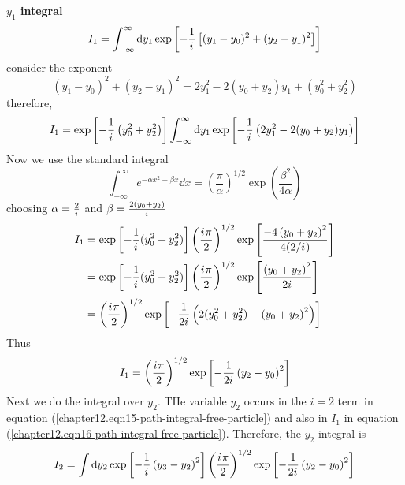 \begin{enumerate}
	\textbf{$y_1$ integral}\\
	\begin{equation}
		I_1 = \int_{-\infty}^{\infty} \dd{y_1} \exp\left[-\frac{1}{{i\mkern1mu}} \left[(y_1 - y_0)^2 + (y_2 - y_1)^2\right]\right]
	\end{equation}
	consider the exponent
	\begin{equation}
		(y_1 - y_0)^2 + (y_2 - y_1)^2 = 2 y_1^2 - 2 (y_0 + y_2) y_1 + (y_0^2+y_2^2)
	\end{equation}
	therefore,
	\begin{equation}
		I_1 = \exp \left[-\frac{1}{{i\mkern1mu}} \left(y_0^2+ y_2^2\right)\right] \int_{-\infty}^{\infty} \dd{y_1} \exp\left[-\frac{1}{{i\mkern1mu}} \left(2y_1^2 - 2(y_0 + y_2) y_1\right)
		\right]
	\end{equation}
	Now we use the standard integral
	\begin{equation}
		\int_{-\infty}^{\infty} e^{-\alpha x^2 + \beta x} \dd{x} = \left(\frac{\pi}{\alpha}\right)^{1/2} \exp \left(\frac{\beta^2}{4\alpha}\right)
	\end{equation}
	choosing $\alpha = \frac{2}{{i\mkern1mu}}$ and $\beta = \frac{2(y_0 + y_2)}{{i\mkern1mu}}$
	\begin{align*}
		I_1 
		&= \exp \left[-\frac{1}{{i\mkern1mu}} (y_0^2 + y_2^2)\right] \left(\frac{{i\mkern1mu} \pi}{2}\right)^{1/2} \exp\left[\frac{-4 \left(y_0 +y_2\right)^2}{4 (2/{i\mkern1mu})}\right]\\
		&= \exp \left[-\frac{1}{{i\mkern1mu}} (y_0^2 + y_2^2)\right] \left(\frac{{i\mkern1mu} \pi}{2}\right)^{1/2} \exp\left[\frac{\left(y_0 +y_2\right)^2}{2{i\mkern1mu}}\right] \\
		&= \left(\frac{{i\mkern1mu} \pi}{2}\right)^{1/2} \exp \left[-\frac{1}{2{i\mkern1mu}} \left( 2(y_0^2 + y_2^2) - \left(y_0 +y_2\right)^2 \right)\right]
	\end{align*}
	Thus
	\begin{equation}
		I_1 = \left(\frac{{i\mkern1mu} \pi}{2}\right)^{1/2} \exp \left[-\frac{1}{2{i\mkern1mu}} \left(y_2 - y_0\right)^2\right]
		\label{chapter12.eqn16-path-integral-free-particle}
	\end{equation}
	Next we do the integral over $y_2$. THe variable $y_2$ occurs in the $i=2$ term in equation (\ref{chapter12.eqn15-path-integral-free-particle}) and also in $I_1$ in equation (\ref{chapter12.eqn16-path-integral-free-particle}). Therefore, the $y_2$ integral is
	\begin{align*}
		I_2 
		&= \int \dd{y_2} \exp \left[-\frac{1}{\iu} \left(y_3 - y_2\right)^2\right] \left(\frac{\iu \pi}{2}\right)^{1/2} \exp \left[-\frac{1}{2 \iu} \left(y_2 - y_0\right)^2\right] \\

\end{align*}
\end{enumerate}
